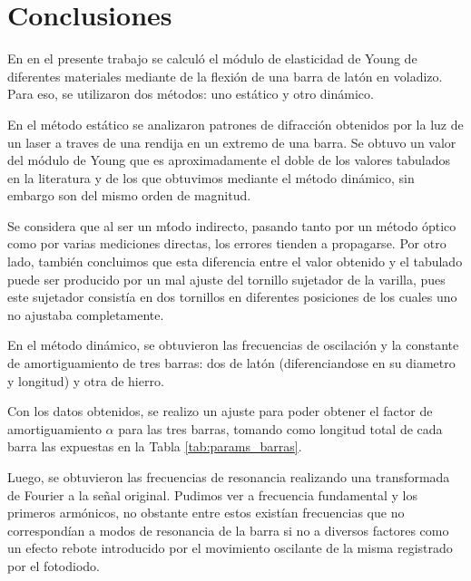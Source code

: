 \documentclass[twoside,twocolumn,a4paper]{article}
\begin{document}

\section{Conclusiones}

En en el presente trabajo se calcul\'o el m\'odulo de elasticidad de Young de diferentes materiales mediante de la flexi\'on de una barra de lat\'on en voladizo. Para eso, se utilizaron dos m\'etodos: uno est\'atico y otro din\'amico. \newline

En el m\'etodo est\'atico se analizaron patrones de difracci\'on obtenidos por la luz de un laser a traves de una rendija en un extremo de una barra. Se obtuvo un valor del m\'odulo de Young que es aproximadamente el doble de los valores tabulados en la literatura y de los que obtuvimos mediante el m\'etodo din\'amico, sin embargo son del mismo orden de magnitud. \newline

Se considera que al ser un m\'todo indirecto, pasando tanto por un m\'etodo \'optico como por varias mediciones directas, los errores tienden a propagarse. Por otro lado, tambi\'en concluimos que esta diferencia entre el valor obtenido y el tabulado puede ser producido por un mal ajuste del tornillo sujetador de la varilla, pues este sujetador consist\'ia en dos tornillos en diferentes posiciones de los cuales uno no ajustaba completamente. \newline


En el m\'etodo din\'amico, se obtuvieron las frecuencias de oscilaci\'on y la constante de amortiguamiento de tres barras: dos de lat\'on (diferenciandose en su diametro y longitud) y otra de hierro. 

Con los datos obtenidos, se realizo un ajuste para poder obtener el factor de amortiguamiento $\alpha$ para las tres barras, tomando como longitud total de cada barra las expuestas en la Tabla \ref{tab:params_barras}.

Luego, se obtuvieron las frecuencias de resonancia realizando una transformada de Fourier a la se\~nal original. Pudimos ver a frecuencia fundamental y los primeros arm\'onicos, no obstante entre estos exist\'ian frecuencias que no correspond\'ian a modos de resonancia de la barra si no a diversos factores como un efecto rebote introducido por el movimiento oscilante de la misma registrado por el fotodiodo. \newline
\end{document}
